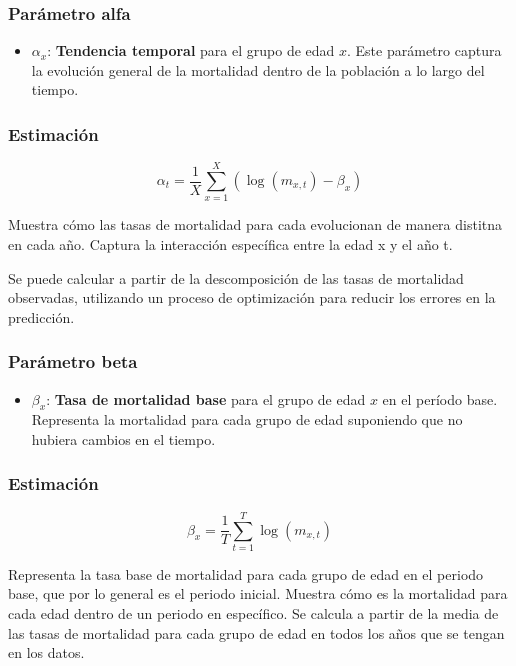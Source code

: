 \documentclass[
]{article}
\providecommand{\tightlist}{%
  \setlength{\itemsep}{0pt}\setlength{\parskip}{0pt}}
\begin{document}
\hypertarget{paruxe1metro-alfa}{%
\subsubsection{Parámetro alfa}\label{paruxe1metro-alfa}}

\begin{itemize}
\tightlist
\item
  \(\alpha_x\): \textbf{Tendencia temporal} para el grupo de edad \(x\).
  Este parámetro captura la evolución general de la mortalidad dentro de
  la población a lo largo del tiempo.
\end{itemize}

\hypertarget{estimaciuxf3n}{%
\subsubsection{Estimación}\label{estimaciuxf3n}}

\[
\alpha_t = \frac{1}{X} \sum_{x=1}^{X} \left(\log(m_{x,t}) - \beta_x \right)
\]

Muestra cómo las tasas de mortalidad para cada evolucionan de manera
distitna en cada año. Captura la interacción específica entre la edad x
y el año t.

Se puede calcular a partir de la descomposición de las tasas de
mortalidad observadas, utilizando un proceso de optimización para
reducir los errores en la predicción.

\hypertarget{paruxe1metro-beta}{%
\subsubsection{Parámetro beta}\label{paruxe1metro-beta}}

\begin{itemize}
\tightlist
\item
  \(\beta_x\): \textbf{Tasa de mortalidad base} para el grupo de edad
  \(x\) en el período base. Representa la mortalidad para cada grupo de
  edad suponiendo que no hubiera cambios en el tiempo.
\end{itemize}

\hypertarget{estimaciuxf3n-1}{%
\subsubsection{Estimación}\label{estimaciuxf3n-1}}

\[
\beta_x = \frac{1}{T} \sum_{t=1}^{T} \log(m_{x,t})
\]

Representa la tasa base de mortalidad para cada grupo de edad en el
periodo base, que por lo general es el periodo inicial. Muestra cómo es
la mortalidad para cada edad dentro de un periodo en específico. Se
calcula a partir de la media de las tasas de mortalidad para cada grupo
de edad en todos los años que se tengan en los datos.
\end{document}

